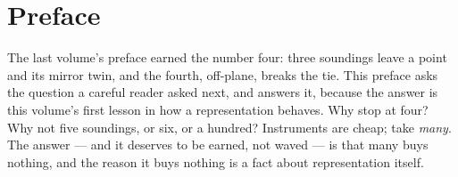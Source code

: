 \chapter*{Preface}

The last volume's preface earned the number four: three soundings leave a
point and its mirror twin, and the fourth, off-plane, breaks the tie. This
preface asks the question a careful reader asked next, and answers it,
because the answer is this volume's first lesson in how a representation
behaves. Why stop at four? Why not five soundings, or six, or a hundred?
Instruments are cheap; take \emph{many}. The answer --- and it deserves to
be earned, not waved --- is that many buys nothing, and the reason it buys
nothing is a fact about representation itself.

